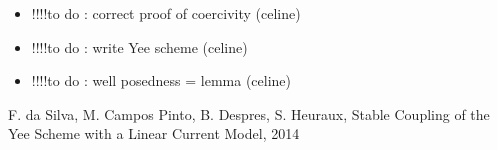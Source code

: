\documentclass[proc]{edpsmath}
\begin{document}
\begin{itemize}
\item !!!!to do : correct proof of coercivity (celine)
\item !!!!to do : write Yee scheme 			(celine)
\item !!!!to do : well posedness = lemma		(celine)
\end{itemize}






\begin{thebibliography}{99}
 F. da Silva, M. Campos Pinto, B. Despres, S. Heuraux, Stable Coupling of the Yee Scheme with a Linear Current Model,
2014
\end{thebibliography}
\end{document}
